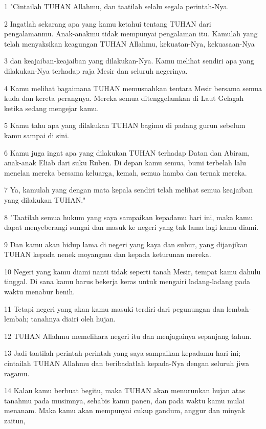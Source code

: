 \par 1 "Cintailah TUHAN Allahmu, dan taatilah selalu segala perintah-Nya.
\par 2 Ingatlah sekarang apa yang kamu ketahui tentang TUHAN dari pengalamanmu. Anak-anakmu tidak mempunyai pengalaman itu. Kamulah yang telah menyaksikan keagungan TUHAN Allahmu, kekuatan-Nya, kekuasaan-Nya
\par 3 dan keajaiban-keajaiban yang dilakukan-Nya. Kamu melihat sendiri apa yang dilakukan-Nya terhadap raja Mesir dan seluruh negerinya.
\par 4 Kamu melihat bagaimana TUHAN memusnahkan tentara Mesir bersama semua kuda dan kereta perangnya. Mereka semua ditenggelamkan di Laut Gelagah ketika sedang mengejar kamu.
\par 5 Kamu tahu apa yang dilakukan TUHAN bagimu di padang gurun sebelum kamu sampai di sini.
\par 6 Kamu juga ingat apa yang dilakukan TUHAN terhadap Datan dan Abiram, anak-anak Eliab dari suku Ruben. Di depan kamu semua, bumi terbelah lalu menelan mereka bersama keluarga, kemah, semua hamba dan ternak mereka.
\par 7 Ya, kamulah yang dengan mata kepala sendiri telah melihat semua keajaiban yang dilakukan TUHAN."
\par 8 "Taatilah semua hukum yang saya sampaikan kepadamu hari ini, maka kamu dapat menyeberangi sungai dan masuk ke negeri yang tak lama lagi kamu diami.
\par 9 Dan kamu akan hidup lama di negeri yang kaya dan subur, yang dijanjikan TUHAN kepada nenek moyangmu dan kepada keturunan mereka.
\par 10 Negeri yang kamu diami nanti tidak seperti tanah Mesir, tempat kamu dahulu tinggal. Di sana kamu harus bekerja keras untuk mengairi ladang-ladang pada waktu menabur benih.
\par 11 Tetapi negeri yang akan kamu masuki terdiri dari pegunungan dan lembah-lembah; tanahnya diairi oleh hujan.
\par 12 TUHAN Allahmu memelihara negeri itu dan menjagainya sepanjang tahun.
\par 13 Jadi taatilah perintah-perintah yang saya sampaikan kepadamu hari ini; cintailah TUHAN Allahmu dan beribadatlah kepada-Nya dengan seluruh jiwa ragamu.
\par 14 Kalau kamu berbuat begitu, maka TUHAN akan menurunkan hujan atas tanahmu pada musimnya, sehabis kamu panen, dan pada waktu kamu mulai menanam. Maka kamu akan mempunyai cukup gandum, anggur dan minyak zaitun,
